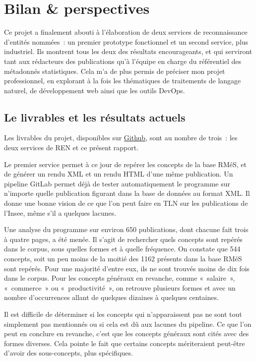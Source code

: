 \section{Bilan \& perspectives}
Ce projet a finalement abouti à l'élaboration de deux services de reconnaissance d'entités nommées~: un premier prototype fonctionnel et un second service, plus industriel. Ils montrent tous les deux des résultats encourageants, et qui serviront tant aux rédacteurs des publications qu'à l'équipe en charge du référentiel des métadonnés statistiques. Cela m'a de plus permis de préciser mon projet professionnel, en explorant à la fois les thématiques de traitements de langage naturel, de développement web ainsi que les outils DevOps.

\subsection{Le livrables et les résultats actuels}
Les livrables du projet, disponibles sur \href{https://github.com/Mardelor?tab=repositories}{Github}, sont au nombre de trois~: les deux services de REN et ce présent rapport.
\newline

Le premier service permet à ce jour de repérer les concepts de la base RMéS, et de générer un rendu XML et un rendu HTML d'une même publication. Un pipeline GitLab permet déjà de tester automatiquement le programme sur n'importe quelle publication figurant dans la base de données au format XML. Il donne une bonne vision de ce que l'on peut faire en TLN sur les publications de l'Insee, même s'il a quelques lacunes.
\newline

Une analyse du programme sur environ 650 publications, dont chacune fait trois à quatre pages, a été menée. Il s'agit de rechercher quels concepts sont repérés dans le corpus, sous quelles formes et à quelle fréquence. On constate que 544 concepts, soit un peu moins de la moitié des 1162 présents dans la base RMéS sont repérés. Pour une majorité d'entre eux, ils ne sont trouvés moins de dix fois dans le corpus. Pour les concepts généraux en revanche, comme «~salaire~», «~commerce~» ou «~productivité~», on retrouve plusieurs formes et avec un nombre d'occurrences allant de quelques dizaines à quelques centaines.

Il est difficile de déterminer si les concepts qui n'apparaissent pas ne sont tout simplement pas mentionnés ou si cela est dû aux lacunes du pipeline. Ce que l'on peut en conclure en revanche, c'est que les concepts généraux sont cités avec des formes diverses. Cela pointe le fait que certains concepts mériteraient peut-être d'avoir des sous-concepts, plus spécifiques.
\newline

